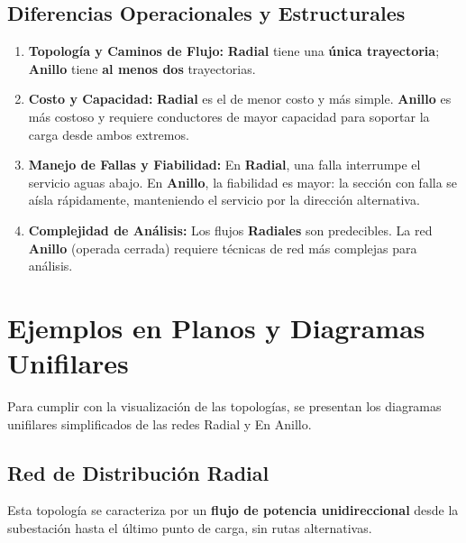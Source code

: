 \subsection{Diferencias Operacionales y Estructurales}

\begin{enumerate}
\item \textbf{Topología y Caminos de Flujo:} \textbf{Radial} tiene una \textbf{única trayectoria}; \textbf{Anillo} tiene \textbf{al menos dos} trayectorias.
\item \textbf{Costo y Capacidad:} \textbf{Radial} es el de menor costo y más simple. \textbf{Anillo} es más costoso y requiere conductores de mayor capacidad para soportar la carga desde ambos extremos.
\item \textbf{Manejo de Fallas y Fiabilidad:} En \textbf{Radial}, una falla interrumpe el servicio aguas abajo. En \textbf{Anillo}, la fiabilidad es mayor: la sección con falla se aísla rápidamente, manteniendo el servicio por la dirección alternativa.
\item \textbf{Complejidad de Análisis:} Los flujos \textbf{Radiales} son predecibles. La red \textbf{Anillo} (operada cerrada) requiere técnicas de red más complejas para análisis.
\end{enumerate}

\section{Ejemplos en Planos y Diagramas Unifilares}

Para cumplir con la visualización de las topologías, se presentan los diagramas unifilares simplificados de las redes Radial y En Anillo.

\subsection{Red de Distribución Radial}
Esta topología se caracteriza por un \textbf{flujo de potencia unidireccional} desde la subestación hasta el último punto de carga, sin rutas alternativas.

